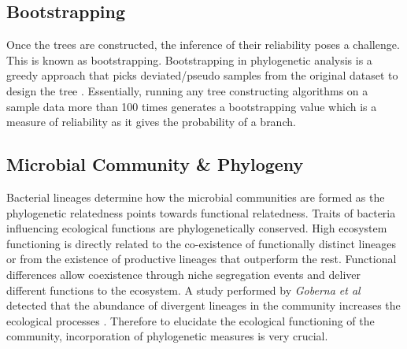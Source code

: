 \subsection{Bootstrapping}

Once the trees are constructed, the inference of their reliability poses a challenge. This is known as bootstrapping. Bootstrapping in phylogenetic analysis is a greedy approach that picks deviated/pseudo samples from the original dataset to design the tree \cite{lemoine_2018_renewing}. Essentially, running any tree constructing algorithms on a sample data more than 100 times generates a bootstrapping value which is a measure of reliability as it gives the probability of a branch.

\subsection{Microbial Community \& Phylogeny}

Bacterial lineages determine how the microbial communities are formed as the phylogenetic relatedness points towards functional relatedness. Traits of bacteria influencing ecological functions are phylogenetically conserved. High ecosystem functioning is directly related to the co-existence of functionally distinct lineages or from the existence of productive lineages that outperform the rest. Functional differences allow coexistence through niche segregation events and deliver different functions to the ecosystem. A study performed by \emph{Goberna et al} detected that the abundance of divergent lineages in the community increases the ecological processes \cite{goberna_2018_phylogeneticscale}. Therefore to elucidate the ecological functioning of the community, incorporation of phylogenetic measures is very crucial.